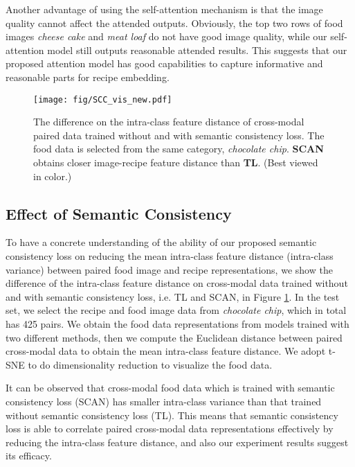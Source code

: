 \documentclass[journal]{IEEEtran}
\begin{document}
Another advantage of using the self-attention mechanism is that the image quality cannot affect the attended outputs. Obviously, the top two rows of food images \emph{cheese cake} and \emph{meat loaf} do not have good image quality, while our self-attention model still outputs reasonable attended results. This suggests that our proposed attention model has good capabilities to capture informative and reasonable parts for recipe embedding. 

\begin{figure}[h!]
\begin{center}
\texttt{[image: fig/SCC\_vis\_new.pdf]}
\end{center}
   \caption{The difference on the intra-class feature distance of cross-modal paired data trained without and with semantic consistency loss. The food data is selected from the same category, \emph{chocolate chip}. \textbf{SCAN} obtains closer image-recipe feature distance than \textbf{TL}. (Best viewed in color.)}
\label{fig:SCC_vis}
\end{figure}

\subsection{Effect of Semantic Consistency}

To have a concrete understanding of the ability of our proposed semantic consistency loss on reducing the mean intra-class feature distance (intra-class variance) between paired food image and recipe representations, we show the difference of the intra-class feature distance on cross-modal data trained without and with semantic consistency loss, i.e. TL and SCAN, in Figure \ref{fig:SCC_vis}. In the test set, we select the recipe and food image data from \emph{chocolate chip}, which in total has 425 pairs. We obtain the food data representations from models trained with two different methods, then we compute the Euclidean distance between paired cross-modal data to obtain the mean intra-class feature distance. We adopt t-SNE \cite{maaten2008visualizing} to do dimensionality reduction to visualize the food data.

It can be observed that cross-modal food data which is trained with semantic consistency loss (SCAN) has smaller intra-class variance than that trained without semantic consistency loss (TL). This means that semantic consistency loss is able to correlate paired cross-modal data representations effectively by reducing the intra-class feature distance, and also our experiment results suggest its efficacy.
\end{document}
